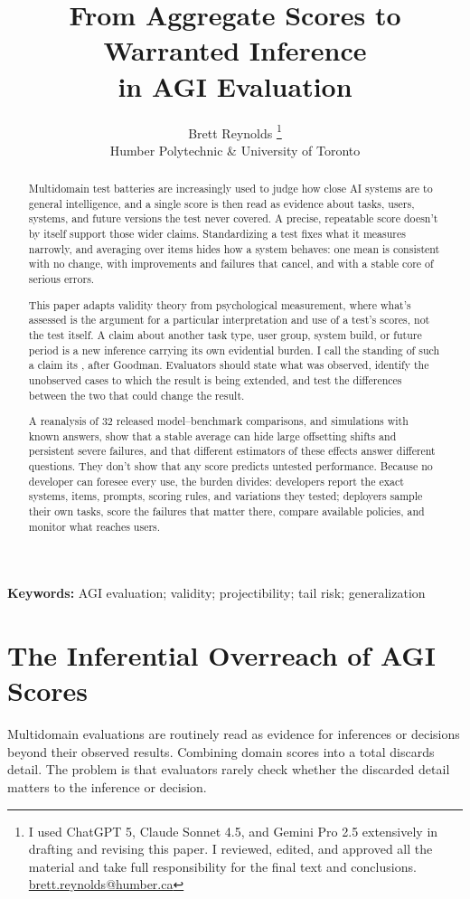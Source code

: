 \documentclass[12pt]{article}
\title{From Aggregate Scores to Warranted Inference\\in AGI Evaluation}
\author{Brett Reynolds \orcidlink{0000-0003-0073-7195}\thanks{I used ChatGPT 5, Claude Sonnet 4.5, and Gemini Pro 2.5 extensively in drafting and revising this paper. I reviewed, edited, and approved all the material and take full responsibility for the final text and conclusions. \href{mailto:brett.reynolds@humber.ca}{brett.reynolds@humber.ca}}\\
Humber Polytechnic \& University of Toronto}
\date{}
\begin{document}
\maketitle

\begin{abstract}
Multidomain test batteries are increasingly used to judge how close AI systems are to general intelligence, and a single score is then read as evidence about tasks, users, systems, and future versions the test never covered. A precise, repeatable score doesn't by itself support those wider claims. Standardizing a test fixes what it measures narrowly, and averaging over items hides how a system behaves: one mean is consistent with no change, with improvements and failures that cancel, and with a stable core of serious errors.

This paper adapts validity theory from psychological measurement, where what's assessed is the argument for a particular interpretation and use of a test's scores, not the test itself. A claim about another task type, user group, system build, or future period is a new inference carrying its own evidential burden. I call the standing of such a claim its , after Goodman. Evaluators should state what was observed, identify the unobserved cases to which the result is being extended, and test the differences between the two that could change the result.

A reanalysis of 32 released model--benchmark comparisons, and simulations with known answers, show that a stable average can hide large offsetting shifts and persistent severe failures, and that different estimators of these effects answer different questions. They don't show that any score predicts untested performance. Because no developer can foresee every use, the burden divides: developers report the exact systems, items, prompts, scoring rules, and variations they tested; deployers sample their own tasks, score the failures that matter there, compare available policies, and monitor what reaches users.
\end{abstract}

\noindent\textbf{Keywords:} AGI evaluation; validity; projectibility; tail risk; generalization

\section{The Inferential Overreach of AGI Scores}\label{sec:problem}

Multidomain evaluations are routinely read as evidence for inferences or decisions beyond their observed results. Combining domain scores into a total discards detail. The problem is that evaluators rarely check whether the discarded detail matters to the inference or decision.
\end{document}
